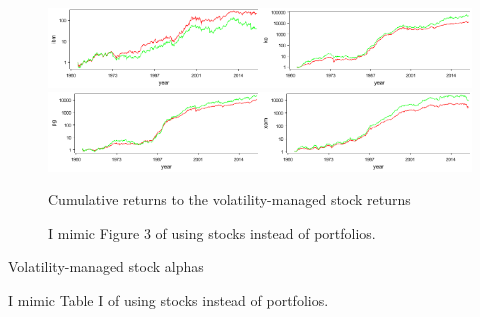 \documentclass{article}
\begin{document}
\begin{figure}
\includegraphics[width=0.5\textwidth]{_ibm}\includegraphics[width=0.5\textwidth]{_ko}
\includegraphics[width=0.5\textwidth]{_pg}\includegraphics[width=0.5\textwidth]{_xom}
\caption{Cumulative returns to the volatility-managed stock returns}
\caption*{I mimic Figure 3 of \citet{moreira2017volatility} using stocks instead of portfolios.}
\end{figure}

\clearpage

\begin{table}
\centering
\caption{Volatility-managed stock alphas}
\caption*{I mimic Table I of \citet{moreira2017volatility} using stocks instead of portfolios.}
\end{table}
\end{document}
